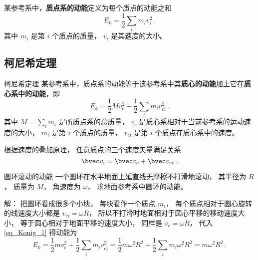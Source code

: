 

某参考系中，\textbf{质点系的动能}定义为每个质点的动能之和
\begin{equation}
E_k = \frac12 \sum_i m_i v_{i}^2 ~.
\end{equation}
其中 $m_i$ 是第 $i$ 个质点的质量， $v_i$ 是其速度的大小。

\subsection{柯尼希定理}

\begin{theorem}{柯尼希定理}
某参考系中，质点系的动能等于该参考系中其\textbf{质心的动能}加上它在\textbf{质心系中的动能}，即
\begin{equation}\label{eq_Konig_1}
E_k = \frac12 Mv_c^2 + \frac12 \sum_i m_i v_{ci}^2 ~.
\end{equation}
其中 $M=\sum_i m_i$ 是所质点系的总质量， $v_c$ 是质心系相对于当前参考系的运动速度的大小， $m_i$ 是第 $i$ 个质点的质量， $v_{ci}$ 是第 $i$ 个质点在质心系中的速度。
\end{theorem}
根据速度的叠加原理， 任意质点的三个速度矢量满足关系
\begin{equation}
\bvec v_i = \bvec v_c + \bvec v_{ci}~.
\end{equation}

\begin{example}{圆环滚动的动能}
一个圆环在水平地面上延直线无摩擦不打滑地滚动， 其半径为 $R$， 质量为 $M$， 角速度为 $\omega$， 求地面参考系中圆环的动能。

解： 把圆环看成很多个小块， 每块看作一个质点 $m_i$， 每个质点相对于圆心旋转的线速度大小都是 $v_{ci} = \omega R$， 所以不打滑时地面相对于圆心平移的移动速度大小， 等于圆心相对于地面平移的速度大小， 同样是 $v_c = \omega R$， 代入\autoref{eq_Konig_1} 得动能为
\begin{equation}
E_k = \frac12 m v_c^2 + \frac12 \sum_i m_i v_{ci}^2 = \frac12 m\omega^2 R^2 + \frac12 \sum_i m_i \omega^2 R^2 = m\omega^2 R^2~.
\end{equation}
\end{example}

